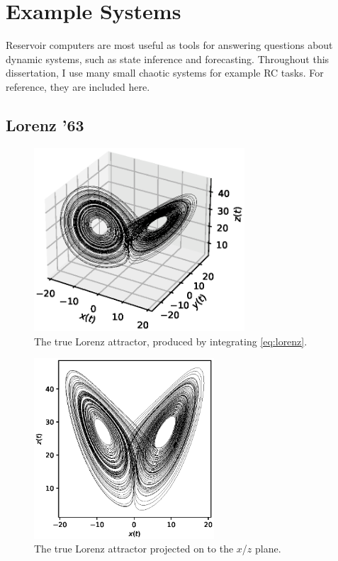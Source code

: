 \chapter{Example Systems}\label{ch:systems}

Reservoir computers are most useful as tools for answering questions
about dynamic systems, such as state inference and
forecasting. Throughout this dissertation, I use many small chaotic systems
for example RC tasks. For reference, they are included here.

\section{Lorenz '63}\label{sec:lorenz}

\begin{figure}
  \includegraphics[width=0.7\textwidth]{figures/lorenz-3d}
  \caption{The true Lorenz attractor, produced by integrating \cref{eq:lorenz}.}%
  \label{fig:lorenz-3d}
\end{figure}

\begin{figure}
  \includegraphics[width=0.6\textwidth]{figures/lorenz}
  \caption{The true Lorenz attractor projected on to the $x$/$z$ plane.}%
  \label{fig:lorenz}
\end{figure}

